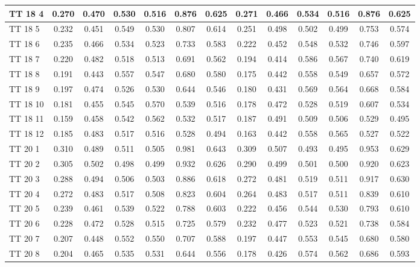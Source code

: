 \documentclass{article}
\begin{document}
\begin{tabular}{|l|c|c|c|c|c|c||c|c|c|c|c|c|}
TT 18  4 & 0.270 & 0.470 & 0.530 & 0.516 & 0.876 & 0.625 & 0.271 & 0.466 & 0.534 & 0.516 & 0.876 & 0.625\\ \hline
TT 18  5 & 0.232 & 0.451 & 0.549 & 0.530 & 0.807 & 0.614 & 0.251 & 0.498 & 0.502 & 0.499 & 0.753 & 0.574\\ \hline
TT 18  6 & 0.235 & 0.466 & 0.534 & 0.523 & 0.733 & 0.583 & 0.222 & 0.452 & 0.548 & 0.532 & 0.746 & 0.597\\ \hline
TT 18  7 & 0.220 & 0.482 & 0.518 & 0.513 & 0.691 & 0.562 & 0.194 & 0.414 & 0.586 & 0.567 & 0.740 & 0.619\\ \hline
TT 18  8 & 0.191 & 0.443 & 0.557 & 0.547 & 0.680 & 0.580 & 0.175 & 0.442 & 0.558 & 0.549 & 0.657 & 0.572\\ \hline
TT 18  9 & 0.197 & 0.474 & 0.526 & 0.530 & 0.644 & 0.546 & 0.180 & 0.431 & 0.569 & 0.564 & 0.668 & 0.584\\ \hline
TT 18 10 & 0.181 & 0.455 & 0.545 & 0.570 & 0.539 & 0.516 & 0.178 & 0.472 & 0.528 & 0.519 & 0.607 & 0.534\\ \hline
TT 18 11 & 0.159 & 0.458 & 0.542 & 0.562 & 0.532 & 0.517 & 0.187 & 0.491 & 0.509 & 0.506 & 0.529 & 0.495\\ \hline
TT 18 12 & 0.185 & 0.483 & 0.517 & 0.516 & 0.528 & 0.494 & 0.163 & 0.442 & 0.558 & 0.565 & 0.527 & 0.522\\ \hline
TT 20  1 & 0.310 & 0.489 & 0.511 & 0.505 & 0.981 & 0.643 & 0.309 & 0.507 & 0.493 & 0.495 & 0.953 & 0.629\\ \hline
TT 20  2 & 0.305 & 0.502 & 0.498 & 0.499 & 0.932 & 0.626 & 0.290 & 0.499 & 0.501 & 0.500 & 0.920 & 0.623\\ \hline
TT 20  3 & 0.288 & 0.494 & 0.506 & 0.503 & 0.886 & 0.618 & 0.272 & 0.481 & 0.519 & 0.511 & 0.917 & 0.630\\ \hline
TT 20  4 & 0.272 & 0.483 & 0.517 & 0.508 & 0.823 & 0.604 & 0.264 & 0.483 & 0.517 & 0.511 & 0.839 & 0.610\\ \hline
TT 20  5 & 0.239 & 0.461 & 0.539 & 0.522 & 0.788 & 0.603 & 0.222 & 0.456 & 0.544 & 0.530 & 0.793 & 0.610\\ \hline
TT 20  6 & 0.228 & 0.472 & 0.528 & 0.515 & 0.725 & 0.579 & 0.232 & 0.477 & 0.523 & 0.521 & 0.738 & 0.584\\ \hline
TT 20  7 & 0.207 & 0.448 & 0.552 & 0.550 & 0.707 & 0.588 & 0.197 & 0.447 & 0.553 & 0.545 & 0.680 & 0.580\\ \hline
TT 20  8 & 0.204 & 0.465 & 0.535 & 0.531 & 0.644 & 0.556 & 0.178 & 0.426 & 0.574 & 0.562 & 0.686 & 0.593\\ \hline

\end{tabular}
\end{document}
